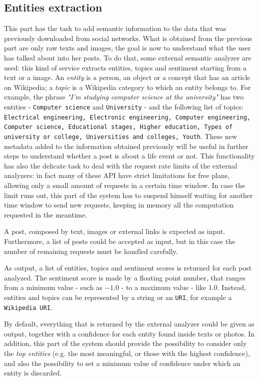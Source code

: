 \subsection{Entities extraction}
This part has the task to add semantic information to the data that was previously downloaded from social networks. What is obtained from the previous part are only raw texts and images, the goal is now to understand what the user has talked about into her posts. To do that, some external semantic analyzer are used: this kind of service extracts entities, topics and sentiment starting from a text or a image. An \emph{entity} is a person, an object or a concept that has an article on Wikipedia; a \emph{topic} is a Wikipedia category to which an entity belongs to. For example, the phrase \textit{"I'm studying computer science at the university"} has two entities - \texttt{Computer science} and \texttt{University} - and the following list of topics: \texttt{Electrical engineering, Electronic engineering, Computer engineering, Computer science, Educational stages, Higher education, Types of university or col\-le\-ge, Universities and colleges, Youth}. These new metadata added to the information obtained previously will be useful in further steps to understand whether a post is about a life event or not. This functionality has also the delicate task to deal with the request rate limits of the external analyzers: in fact many of these API have strict limitations for free plans, allowing only a small amount of requests in a certain time window. In case the limit runs out, this part of the system has to suspend himself waiting for another time window to send new requests, keeping in memory all the computation requested in the meantime.

A post, composed by text, images or external links is expected as input. Furthermore, a list of posts could be accepted as input, but in this case the number of remaining requests must be handled carefully.

As output, a list of entities, topics and sentiment scores is returned for each post analyzed. The sentiment score is made by a floating point number, that ranges from a minimum value - such as $ -1.0 $ - to a maximum value - like $ 1.0 $. Instead, entities and topics can be represented by a string or an \texttt{URI}, for example a \texttt{Wikipedia URI}.

By default, everything that is returned by the external analyzer could be given as output, together with a confidence for each entity found inside texts or photos. In addition, this part of the system should provide the possibility to consider only the \emph{top entities} (e.g. the most meaningful, or those with the highest confidence), and also the possibility to set a minimum value of confidence under which an entity is discarded.

